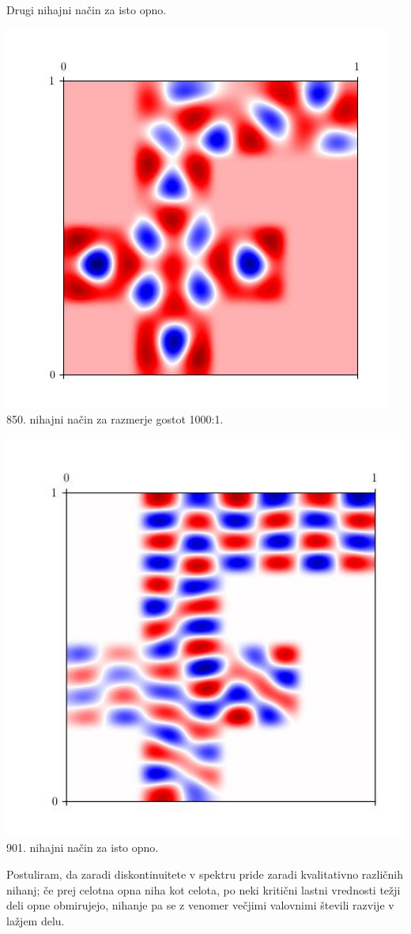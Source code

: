 \begin{center}
\begin{minipage}{0.45\textwidth}
        Drugi nihajni način za isto opno.
    \end{minipage}
    \begin{minipage}{0.45\textwidth}
        \centering
    \includegraphics[width=\textwidth]{../old/1-1-eigenmode-849.jpg}
    850. nihajni način za razmerje gostot 1000:1.
    \end{minipage}\hfill
    \begin{minipage}{0.45\textwidth}
        \centering
        \includegraphics[width=1\textwidth]{../old/1-1-eigenmode-900.jpg}
        901. nihajni način za isto opno.
    \end{minipage}
\end{center}
Postuliram, da zaradi diskontinuitete v spektru pride zaradi kvalitativno različnih nihanj; če prej celotna opna niha kot celota, po neki kritični lastni vrednosti težji deli opne obmirujejo, nihanje pa se z venomer večjimi valovnimi števili razvije v lažjem delu.

